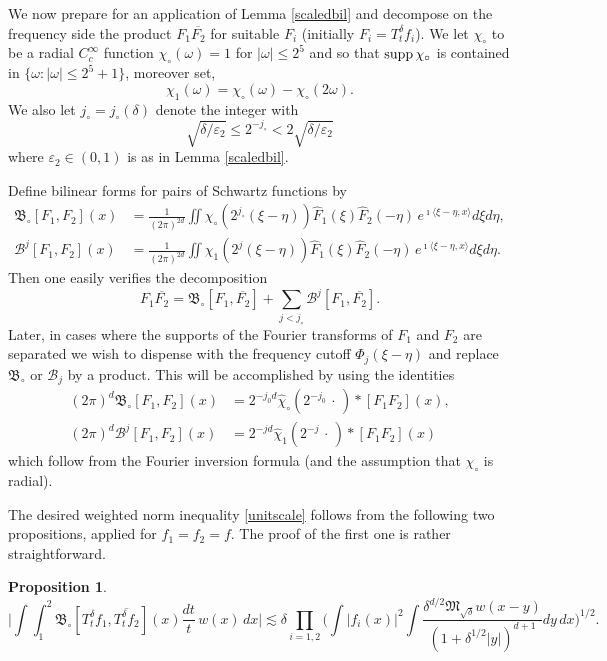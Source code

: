 \documentclass[11pt]{amsart}
\newtheorem{proposition}[theorem]{Proposition}
\theoremstyle{definition}
\numberwithin{theorem}{section}
\numberwithin{definition}{section}
\def\im{\imath}
\def\inn#1#2{\langle#1,#2\rangle}
\newcommand{\Be}{\begin{equation}}
\newcommand{\Ee}{\end{equation}}
\newcommand{\note}[1]{\footnote{\texttt{\Small #1}}}
\def\supp{{\text{\rm supp}\,}}
\def\inn#1#2{\langle#1,#2\rangle}
\def\lc{\lesssim}
\def\eps{\varepsilon}
\def\om{\omega}              \def\Om{\Omega}
\def\fB{{\mathfrak {B}}}
\def\fM{{\mathfrak {M}}}
\def\cB{{\mathcal {B}}}
\begin{document}
We now prepare for an application of Lemma
\ref{scaledbil} and decompose on the frequency side
 the product $F_1\overline{F_2}$ for
suitable $F_i$ (initially  $F_i= T^\delta_t f_i$).
We let $\chi_\circ$ to be a radial $C^\infty_c$ function
$\chi_\circ(\om)=1$ for $|\om|\le 2^{5}$ and so that
 $\supp \chi_\circ$ is contained in $\{\om:|\om|\le 2^5+1\}$, moreover set,
$$\chi_1(\om) =\chi_\circ(\om)-\chi_\circ(2\om).$$
We also let $j_\circ=j_\circ(\delta)$ denote the integer with
$$\sqrt{\delta/\eps_2}\le 2^{-j_\circ}<2\sqrt{\delta/\eps_2}$$
where $\eps_2\in (0,1)$ is as in Lemma \ref{scaledbil}.

Define bilinear forms for pairs of Schwartz functions by
\Be\label{bildef}\begin{aligned} \fB_\circ [F_1,F_2](x)  &=
\frac{1}{(2\pi)^{2d}}\iint \chi_\circ (2^{j_\circ}(\xi-\eta))
\widehat F_1(\xi) \widehat F_2(-\eta)\,e^{\im \inn{\xi-\eta}{x}}
d\xi d\eta,
\\
\cB^j[F_1,F_2](x)  &=
\frac{1}{(2\pi)^{2d}}\iint \chi_1 (2^{j}(\xi-\eta))
\widehat F_1(\xi) \widehat F_2(-\eta)\,e^{\im \inn{\xi-\eta}{x}}
d\xi d\eta.
\end{aligned}\Ee
Then one easily verifies the decomposition
$$
F_1\overline{F_2}= \fB_\circ [F_1,\overline{F_2}] + \sum_{j<j_\circ}
\cB^j[F_1,\overline{F_2}].
$$
Later, in  cases where the supports of the Fourier  transforms of
$F_1$ and $F_2$ are separated we wish to dispense with the frequency
cutoff $\Phi_j(\xi-\eta)$ and replace $\fB_\circ$ or $\cB_j$ by
 a product.
This will be  accomplished by using the identities
\Be\label{averaging}
\begin{aligned}
(2\pi)^{d} \fB_\circ[F_1,F_2](x)&=
2^{-j_0d}  \widehat \chi_\circ (2^{-j_0}\,\cdot\,) *[F_1F_2] (x),
\\
(2\pi)^{d} \cB^j[F_1,F_2](x)&= 2^{-jd}\widehat \chi_1 (2^{-j}\,\cdot\,) *[F_1F_2] (x)
\end{aligned}
\Ee
which follow from
 the Fourier inversion formula (and the assumption that
$\chi_\circ$ is radial).




The desired weighted norm inequality \eqref{unitscale} follows from
the following two propositions, applied for $f_1=f_2=f$.
The proof of the first one is rather straightforward.
\begin{proposition}  \label{Bcirc}
\begin{equation*}
\Big|\int\! \int_{1}^{2}
\fB_\circ [T^\delta_t f_1,\overline{T^{\delta}_t f_2}](x) \frac{dt}{t}\,
w(x)\,dx\Big|
\lc
\delta
\prod_{i=1,2}\Big(\int |f_i(x)|^2 \int \frac{\delta^{d/2}
\fM_{\sqrt\delta}w(x-y)}{(1+\delta^{1/2} |y|)^{d+1}} dy\, dx\Big)^{1/2}.
\end{equation*}
\end{proposition}
\end{document}
